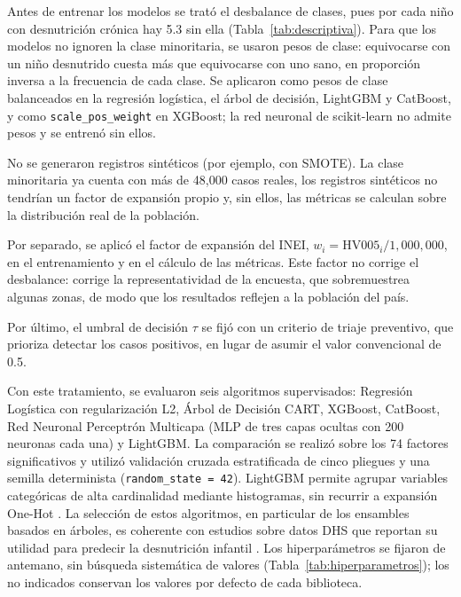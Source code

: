 \documentclass[final,5p,times,twocolumn,authoryear,lefttitle]{elsarticle}
\begin{document}
Antes de entrenar los modelos se trató el desbalance de clases, pues por cada niño con desnutrición crónica hay 5.3 sin ella (Tabla~\ref{tab:descriptiva}). Para que los modelos no ignoren la clase minoritaria, se usaron pesos de clase: equivocarse con un niño desnutrido cuesta más que equivocarse con uno sano, en proporción inversa a la frecuencia de cada clase. Se aplicaron como pesos de clase balanceados en la regresión logística, el árbol de decisión, LightGBM y CatBoost, y como \texttt{scale\_pos\_weight} en XGBoost; la red neuronal de scikit-learn no admite pesos y se entrenó sin ellos.

No se generaron registros sintéticos (por ejemplo, con SMOTE). La clase minoritaria ya cuenta con más de 48,000 casos reales, los registros sintéticos no tendrían un factor de expansión propio y, sin ellos, las métricas se calculan sobre la distribución real de la población.

Por separado, se aplicó el factor de expansión del INEI, $w_i=\mathrm{HV005}_i/1{,}000{,}000$, en el entrenamiento y en el cálculo de las métricas. Este factor no corrige el desbalance: corrige la representatividad de la encuesta, que sobremuestrea algunas zonas, de modo que los resultados reflejen a la población del país.

Por último, el umbral de decisión $\tau$ se fijó con un criterio de triaje preventivo, que prioriza detectar los casos positivos, en lugar de asumir el valor convencional de 0.5.

Con este tratamiento, se evaluaron seis algoritmos supervisados: Regresión Logística con regularización L2, Árbol de Decisión CART, XGBoost, CatBoost, Red Neuronal Perceptrón Multicapa (MLP de tres capas ocultas con 200 neuronas cada una) y LightGBM. La comparación se realizó sobre los 74 factores significativos y utilizó validación cruzada estratificada de cinco pliegues y una semilla determinista (\texttt{random\_state = 42}). LightGBM permite agrupar variables categóricas de alta cardinalidad mediante histogramas, sin recurrir a expansión One-Hot \citep{bentejac2021gradientboosting}. La selección de estos algoritmos, en particular de los ensambles basados en árboles, es coherente con estudios sobre datos DHS que reportan su utilidad para predecir la desnutrición infantil \citep{bitew2021ethiopia,talukder2020bangladesh,chilyabanyama2022zambia}. Los hiperparámetros se fijaron de antemano, sin búsqueda sistemática de valores (Tabla~\ref{tab:hiperparametros}); los no indicados conservan los valores por defecto de cada biblioteca.
\end{document}
